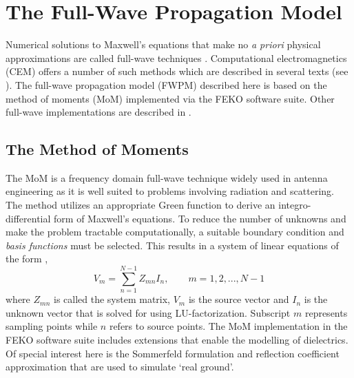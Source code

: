 \documentclass[10pt,journal,twoside]{IEEEtran}
\begin{document}
\section{The Full-Wave Propagation Model}\label{The Full-Wave Propagation Model}
Numerical solutions to Maxwell's equations that make no \emph{a priori} physical approximations are called full-wave techniques \cite{Davidson2011}. Computational electromagnetics (CEM) offers a number of such methods which are described in several texts (see \cite{Davidson2011,Jin,Gibson}). The full-wave propagation model (FWPM) described here is based on the method of moments (MoM) implemented via the FEKO software suite. Other full-wave implementations are described in \cite{Hviid95,Yagbasan2010,Brennan2014}. %
%
\subsection{The Method of Moments}
The MoM is a frequency domain full-wave technique widely used in antenna engineering as it is well suited to problems involving radiation and scattering. The method utilizes an appropriate Green function to derive an integro-differential form of Maxwell's equations. To reduce the number of unknowns and make the problem tractable computationally, a suitable boundary condition and \emph{basis functions} must be selected. This results in a system of linear equations of the form \cite{Jin},
\begin{equation}
 V_m  = \sum\limits_{n=1}^{N-1} Z_{mn} I_n, \qquad m = 1,2,...,N-1
\end{equation}
where $Z_{mn}$ is called the system matrix, $V_m$ is the source vector and $I_n$ is the unknown vector that is solved for using LU-factorization. Subscript $m$ represents sampling points while $n$ refers to source points. %
The MoM implementation in the FEKO software suite includes extensions that enable the modelling of dielectrics. Of special interest here is the Sommerfeld formulation and reflection coefficient approximation that are used to simulate `real ground'.
%
\end{document}
